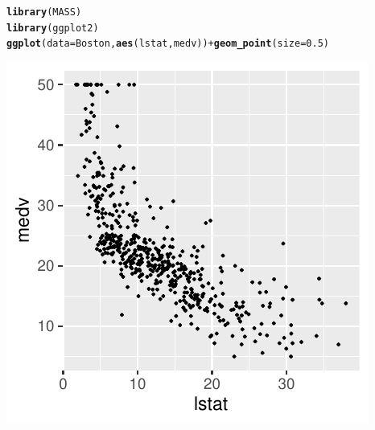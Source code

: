 \documentclass[11pt]{article}\usepackage[]{graphicx}\usepackage[]{color}
\makeatletter
\def\maxwidth{ %
  \ifdim\Gin@nat@width>\linewidth
    \linewidth
  \else
    \Gin@nat@width
  \fi
}
\newcommand{\hlnum}[1]{\textcolor[rgb]{0.686,0.059,0.569}{#1}}%
\newcommand{\hlopt}[1]{\textcolor[rgb]{0,0,0}{#1}}%
\newcommand{\hlstd}[1]{\textcolor[rgb]{0.345,0.345,0.345}{#1}}%
\newcommand{\hlkwc}[1]{\textcolor[rgb]{0.333,0.667,0.333}{#1}}%
\newcommand{\hlkwd}[1]{\textcolor[rgb]{0.737,0.353,0.396}{\textbf{#1}}}%
\newenvironment{kframe}{%
 \def\at@end@of@kframe{}%
 \ifinner\ifhmode%
  \def\at@end@of@kframe{\end{minipage}}%
  \begin{minipage}{\columnwidth}%
 \fi\fi%
 \def\FrameCommand##1{\hskip\@totalleftmargin \hskip-\fboxsep
 \colorbox{shadecolor}{##1}\hskip-\fboxsep
     \hskip-\linewidth \hskip-\@totalleftmargin \hskip\columnwidth}%
 \MakeFramed {\advance\hsize-\width
   \@totalleftmargin\z@ \linewidth\hsize
   \@setminipage}}%
 {\par\unskip\endMakeFramed%
 \at@end@of@kframe}
\newenvironment{knitrout}{}{} %
\makeatother
\begin{document}
\begin{knitrout}
\color{fgcolor}\begin{kframe}
\begin{alltt}
\hlkwd{library}\hlstd{(MASS)}
\hlkwd{library}\hlstd{(ggplot2)}
\hlkwd{ggplot}\hlstd{(}\hlkwc{data}\hlstd{=Boston,} \hlkwd{aes}\hlstd{(lstat, medv))} \hlopt{+} \hlkwd{geom_point}\hlstd{(}\hlkwc{size}\hlstd{=}\hlnum{0.5}\hlstd{)}
\end{alltt}
\end{kframe}
\includegraphics[width=\maxwidth]{figure/unnamed-chunk-1-1} 

\end{knitrout}
\clearpage
\end{document}
